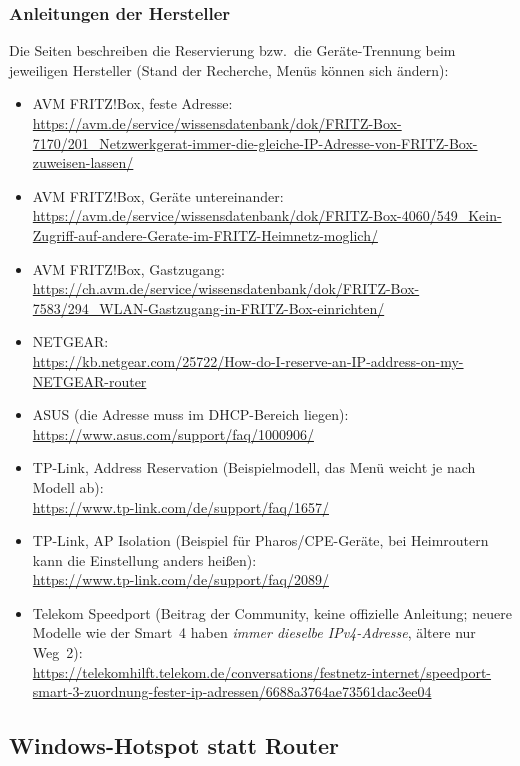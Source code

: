 \documentclass[a4paper,11pt]{article}
\begin{document}
\subsubsection*{Anleitungen der Hersteller}

Die Seiten beschreiben die Reservierung bzw.\ die Geräte-Trennung beim jeweiligen Hersteller (Stand der Recherche,
Menüs können sich ändern):
\begin{itemize}
  \item AVM FRITZ!Box, feste Adresse:\\
  \url{https://avm.de/service/wissensdatenbank/dok/FRITZ-Box-7170/201_Netzwerkgerat-immer-die-gleiche-IP-Adresse-von-FRITZ-Box-zuweisen-lassen/}
  \item AVM FRITZ!Box, Geräte untereinander:\\
  \url{https://avm.de/service/wissensdatenbank/dok/FRITZ-Box-4060/549_Kein-Zugriff-auf-andere-Gerate-im-FRITZ-Heimnetz-moglich/}
  \item AVM FRITZ!Box, Gastzugang:\\
  \url{https://ch.avm.de/service/wissensdatenbank/dok/FRITZ-Box-7583/294_WLAN-Gastzugang-in-FRITZ-Box-einrichten/}
  \item NETGEAR:\\
  \url{https://kb.netgear.com/25722/How-do-I-reserve-an-IP-address-on-my-NETGEAR-router}
  \item ASUS (die Adresse muss im DHCP-Bereich liegen):\\
  \url{https://www.asus.com/support/faq/1000906/}
  \item TP-Link, Address Reservation (Beispielmodell, das Menü weicht je nach Modell ab):\\
  \url{https://www.tp-link.com/de/support/faq/1657/}
  \item TP-Link, AP Isolation (Beispiel für Pharos/CPE-Geräte, bei Heimroutern kann die Einstellung anders heißen):\\
  \url{https://www.tp-link.com/de/support/faq/2089/}
  \item Telekom Speedport (Beitrag der Community, keine offizielle Anleitung; neuere Modelle wie der Smart~4 haben
  \emph{immer dieselbe IPv4-Adresse}, ältere nur Weg~2):\\
  \url{https://telekomhilft.telekom.de/conversations/festnetz-internet/speedport-smart-3-zuordnung-fester-ip-adressen/6688a3764ae73561dac3ee04}
\end{itemize}

\subsection{Windows-Hotspot statt Router}
\end{document}
